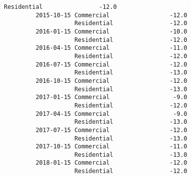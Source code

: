 \documentclass[11pt]{article}
\begin{document}
\begin{Verbatim}[commandchars=\\\{\}]
                    Residential                -12.0  
         2015-10-15 Commercial                 -12.0  
                    Residential                -12.0  
         2016-01-15 Commercial                 -10.0  
                    Residential                -12.0  
         2016-04-15 Commercial                 -11.0  
                    Residential                -12.0  
         2016-07-15 Commercial                 -12.0  
                    Residential                -13.0  
         2016-10-15 Commercial                 -12.0  
                    Residential                -13.0  
         2017-01-15 Commercial                  -9.0  
                    Residential                -12.0  
         2017-04-15 Commercial                  -9.0  
                    Residential                -13.0  
         2017-07-15 Commercial                 -12.0  
                    Residential                -13.0  
         2017-10-15 Commercial                 -11.0  
                    Residential                -13.0  
         2018-01-15 Commercial                 -12.0  
                    Residential                -12.0  
\end{Verbatim}
            
\end{document}
